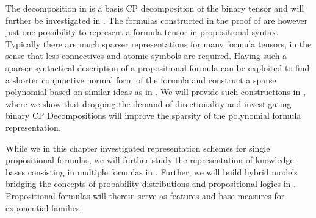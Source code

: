 \begin{remark}
    The decomposition in  is a basis CP decomposition of the binary tensor and will further be investigated in .
    The formulas constructed in the proof of  are however just one possibility to represent a formula tensor in propositional syntax.
    Typically there are much sparser representations for many formula tensors, in the sense that less connectives and atomic symbols are required.
    Having such a sparser syntactical description of a propositional formula can be exploited to find a shorter conjunctive normal form of the formula and construct a sparse polynomial based on similar ideas as in .
    We will provide such constructions in , where we show that dropping the demand of directionality and investigating binary CP Decompositions will improve the sparsity of the polynomial formula representation.
\end{remark}



While we in this chapter investigated representation schemes for single propositional formulas, we will further study the representation of knowledge bases consisting in multiple formulas in .
Further, we will build hybrid models bridging the concepts of probability distributions and propositional logics in .
Propositional formulas will therein serve as features and base measures for exponential families.